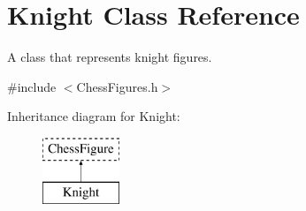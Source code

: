 \hypertarget{classKnight}{}\section{Knight Class Reference}
\label{classKnight}


A class that represents knight figures.  




{\ttfamily \#include $<$Chess\+Figures.\+h$>$}

Inheritance diagram for Knight\+:\begin{figure}[H]
\begin{center}
\leavevmode
\includegraphics[height=2.000000cm]{classKnight}
\end{center}
\end{figure}
